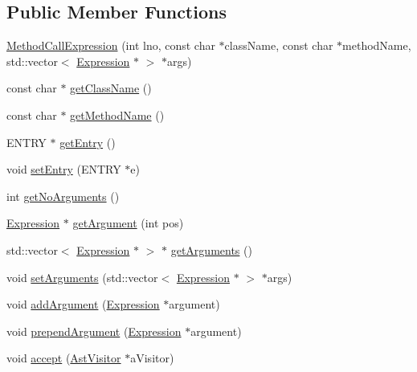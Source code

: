 \subsection*{Public Member Functions}
\begin{DoxyCompactItemize}
\item 
\hyperlink{classMethodCallExpression_a5019b48097b4bcddd2016e19e7aa9b21}{MethodCallExpression} (int lno, const char $\ast$className, const char $\ast$methodName, std::vector$<$ \hyperlink{classExpression}{Expression} $\ast$ $>$ $\ast$args)
\item 
const char $\ast$ \hyperlink{classMethodCallExpression_aac842be4123a65f75e09dad4369fcdb2}{getClassName} ()
\item 
const char $\ast$ \hyperlink{classMethodCallExpression_a53338c550e4f939f8c263f08a52ec8f5}{getMethodName} ()
\item 
ENTRY $\ast$ \hyperlink{classMethodCallExpression_acba6b59d3a951124c09bc8222dea1b82}{getEntry} ()
\item 
void \hyperlink{classMethodCallExpression_a573fa44f50e5c3c55e0801d726ccf594}{setEntry} (ENTRY $\ast$e)
\item 
int \hyperlink{classMethodCallExpression_ac827bda72aa7edd546dc70ba7e4dea7a}{getNoArguments} ()
\item 
\hyperlink{classExpression}{Expression} $\ast$ \hyperlink{classMethodCallExpression_a8fdb332750c263169f163cd15bf2181c}{getArgument} (int pos)
\item 
std::vector$<$ \hyperlink{classExpression}{Expression} $\ast$ $>$ $\ast$ \hyperlink{classMethodCallExpression_ac8d64b39cf5cce5ff7baaef80e9c8911}{getArguments} ()
\item 
void \hyperlink{classMethodCallExpression_a31c2b10a2914b5a71d16feab9bb96d34}{setArguments} (std::vector$<$ \hyperlink{classExpression}{Expression} $\ast$ $>$ $\ast$args)
\item 
void \hyperlink{classMethodCallExpression_a40f6c0c6861cc3ea50253a47a7ec6879}{addArgument} (\hyperlink{classExpression}{Expression} $\ast$argument)
\item 
void \hyperlink{classMethodCallExpression_a1930d4df840960e60304da85acc70b63}{prependArgument} (\hyperlink{classExpression}{Expression} $\ast$argument)
\item 
void \hyperlink{classMethodCallExpression_a306fe23511d0d35c003a6256816ccea6}{accept} (\hyperlink{classAstVisitor}{AstVisitor} $\ast$aVisitor)
\end{DoxyCompactItemize}


